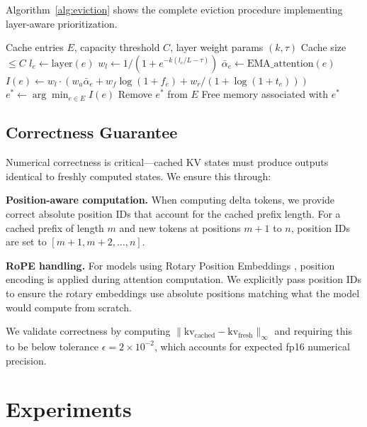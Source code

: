 \documentclass[10pt,conference]{IEEEtran}
\begin{document}
Algorithm~\ref{alg:eviction} shows the complete eviction procedure implementing layer-aware prioritization.

\begin{algorithm}[t]
\caption{Layer-Aware Cache Eviction}
\label{alg:eviction}
\begin{algorithmic}[1]
\Require Cache entries $E$, capacity threshold $C$, layer weight params $(k, \tau)$
\Ensure Cache size $\leq C$
        \State $l_e \gets \text{layer}(e)$ 
        \State $w_l \gets 1 / (1 + e^{-k(l_e/L - \tau)})$ 
        \State $\bar{\alpha}_e \gets \text{EMA\_attention}(e)$
        \State $I(e) \gets w_l \cdot (w_a \bar{\alpha}_e + w_f \log(1+f_e) + w_r/(1+\log(1+t_e)))$
    \EndFor
    \State $e^* \gets \arg\min_{e \in E} I(e)$ 
    \State Remove $e^*$ from $E$
    \State Free memory associated with $e^*$
\EndWhile
\end{algorithmic}
\end{algorithm}

\subsection{Correctness Guarantee}

Numerical correctness is critical---cached KV states must produce outputs identical to freshly computed states. We ensure this through:

\textbf{Position-aware computation.} When computing delta tokens, we provide correct absolute position IDs that account for the cached prefix length. For a cached prefix of length $m$ and new tokens at positions $m+1$ to $n$, position IDs are set to $[m+1, m+2, \ldots, n]$.

\textbf{RoPE handling.} For models using Rotary Position Embeddings \cite{su2024roformer}, position encoding is applied during attention computation. We explicitly pass position IDs to ensure the rotary embeddings use absolute positions matching what the model would compute from scratch.

We validate correctness by computing $\|\text{kv}_\text{cached} - \text{kv}_\text{fresh}\|_\infty$ and requiring this to be below tolerance $\epsilon = 2 \times 10^{-2}$, which accounts for expected fp16 numerical precision.

\section{Experiments}
\end{document}
